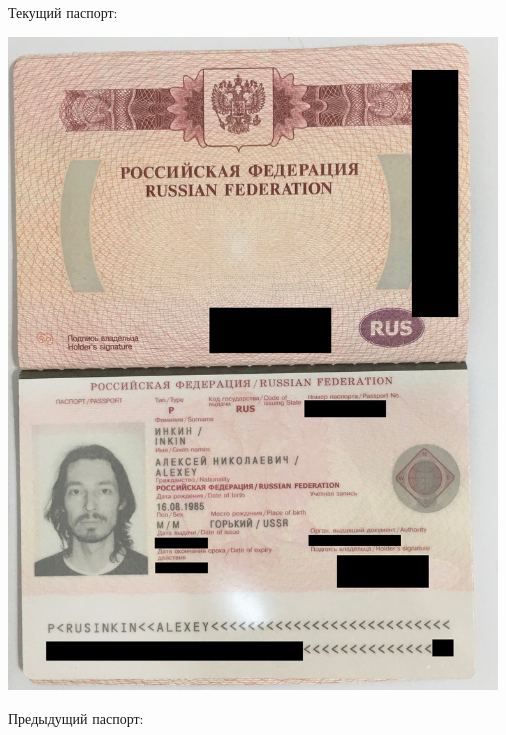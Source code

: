 \label{Passport}

Текущий паспорт:

\includegraphics[width=35em]{passport-2022_public}
\pagebreak

Предыдущий паспорт:

